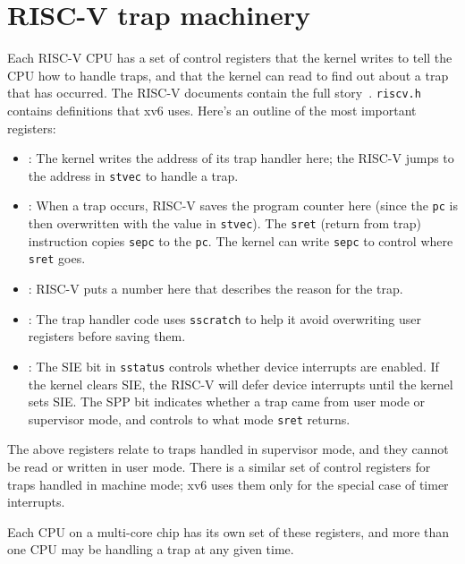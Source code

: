 \section{RISC-V trap machinery}

Each RISC-V CPU has a set of control registers that the kernel writes to
tell the CPU how to handle traps, and that the kernel can read
to find out about a trap that has occurred. The RISC-V documents
contain the full story~\cite{riscv:priv}. {\tt riscv.h}
 contains definitions that xv6 uses. Here's
an outline of the most important registers:

\begin{itemize}

\item {}: The kernel writes the address of its trap handler
  here; the RISC-V jumps to the address in {\tt stvec} to handle a trap.

\item {}: When a trap occurs, RISC-V saves the program counter
  here (since the {\tt pc} is then overwritten with the
  value in {\tt stvec}). The
  {\tt sret} (return from trap) instruction copies {\tt sepc} to the
  {\tt pc}. The kernel can write {\tt sepc} to control where {\tt
    sret} goes.

\item {}: RISC-V puts a number here that describes
the reason for the trap.

\item {}: The trap handler code uses {\tt sscratch}
  to help it avoid overwriting user registers before saving them.

\item {}: The SIE bit in {\tt sstatus}
  controls whether device interrupts
  are enabled. If the kernel clears SIE, the RISC-V will defer
  device interrupts until the kernel sets SIE. The SPP bit
  indicates whether a trap came from user mode or supervisor
  mode, and controls to what mode {\tt sret} returns.

\end{itemize}

The above registers relate to traps handled in supervisor mode, and they
cannot be read or written in user mode. There is a similar set of
control registers for traps handled in machine mode; xv6 uses
them only for the special case of timer interrupts.

Each CPU on a multi-core chip has its own set of these registers,
and more than one CPU may be handling a trap at any given time.

